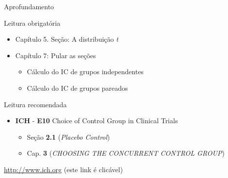 \documentclass{beamer}
\begin{document}
\begin{frame}{\scriptsize Aprofundamento}
  \begin{block}{Leitura obrigatória}
    \begin{itemize}
      \footnotesize
    \item Capítulo 5. Seção: A distribuição {\em t}
    \item Capítulo 7: Pular as seções
      \begin{itemize}
        \scriptsize
      \item Cálculo do IC de grupos independentes
      \item Cálculo do IC de grupos pareados
      \end{itemize}
    \end{itemize}
  \end{block}
  \begin{block}{Leitura recomendada}
    \begin{itemize}
    \scriptsize
    \item {\bf ICH} - {\bf E10} Choice of Control Group in Clinical
      Trials
    \begin{itemize}
      \tiny
    \item Seção {\bf 2.1} ({\em Placebo Control})
    \item Cap. {\bf 3} ({\em CHOOSING THE CONCURRENT CONTROL GROUP})
    \end{itemize}
  \end{itemize}
    \hfill \scriptsize \href{http://www.ich.org/products/guidelines/efficacy/efficacy-single/article/choice-of-control-group-and-related-issues-in-clinical-trials.html}{http://www.ich.org} {\tiny (este link é clicável)}
  \end{block}
\end{frame}
\end{document}
